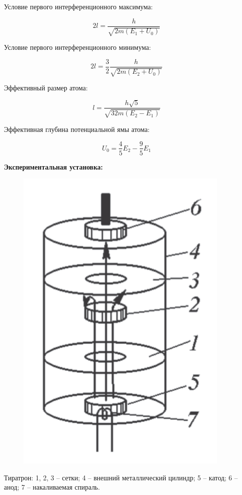 \documentclass[a4paper, 12pt]{article}%
\begin{document}
	Условие первого интерференционного максимума:

\[2l = \dfrac{h}{\sqrt{2m(E_1 + U_0)}}\]

Условие первого интерференционного минимума:

\[2l = \dfrac{3}{2}\dfrac{h}{\sqrt{2m(E_2 + U_0)}}\]

Эффективный размер атома:

\[l = \dfrac{h\sqrt{5}}{\sqrt{32m(E_2 - E_1)}}\]

Эффективная глубина потенциальной ямы атома:

\[U_0 = \dfrac{4}{5}E_2 - \dfrac{9}{5}E_1\]

\textbf{Экспериментальная установка:}\\\par

	\begin{figure}[h!]
		\centering
		\includegraphics[scale=0.4]{Схема_3.PNG}
	\end{figure}

	Тиратрон: 1, 2, 3 -- сетки; 4 -- внешний металлический цилиндр; 5 -- катод; 6 -- анод; 7 -- накаливаемая спираль.
\end{document}
